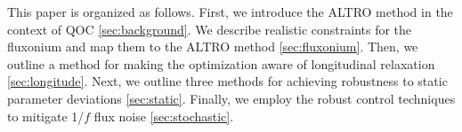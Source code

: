 This paper is organized as follows.
First, we introduce the ALTRO method in the context of QOC \ref{sec:background}.
We describe realistic constraints for the fluxonium and
map them to the ALTRO method \ref{sec:fluxonium}. Then, we
outline a method for making the optimization aware of longitudinal
relaxation \ref{sec:longitude}. Next, we outline three methods for achieving
robustness to static parameter deviations \ref{sec:static}. Finally,
we employ the robust control techniques to mitigate 1/$f$ flux noise
\ref{sec:stochastic}.

